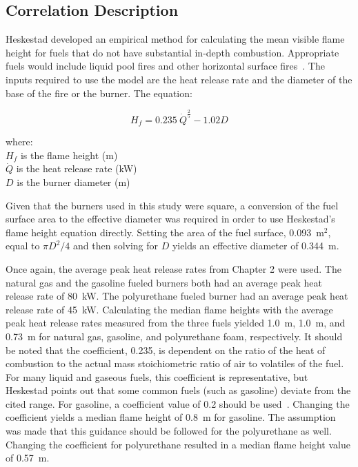 \documentclass[twoside]{uocthesis}
\begin{document}
{\subsection{Correlation Description}

Heskestad developed an empirical method for calculating the mean visible flame height for fuels that do not have substantial in-depth combustion.  Appropriate fuels would include liquid pool fires and other horizontal surface fires~\cite{Heskestad:SFPE,Beyler:1986}. The inputs required to use the model are the heat release rate and the diameter of the base of the fire or the burner.  The equation:

\begin{equation}\label{eq:flame_height}
H_f = 0.235\: \dot{Q}^{\frac{2}{5}} - 1.02 D
\end{equation}

\begin{tabbing}
where: \=  \\
{}
\> $H_{f}$ is the flame height (m)\\
\> $\dot{Q}$ is the heat release rate (kW) \\ 
\> $D$ is the burner diameter (m) \\
\end{tabbing}

Given that the burners used in this study were square, a conversion of the fuel surface area to the effective diameter was required in order to use Heskestad's flame height equation directly.  Setting the area of the fuel surface, 0.093~m$^2$, equal to $\pi D^2/4$ and then solving for $D$ yields an effective diameter of 0.344~m.

Once again, the average peak heat release rates from Chapter 2 were used.  The natural gas and the gasoline fueled burners both had an average peak heat release rate of 80~kW.  The polyurethane fueled burner had an average peak heat release rate of 45~kW.  Calculating the median flame heights with the average peak heat release rates measured from the three fuels yielded 1.0~m, 1.0~m, and 0.73~m for natural gas, gasoline, and polyurethane foam, respectively. It should be noted that the coefficient, 0.235, is dependent on the ratio of the heat of combustion to the actual mass stoichiometric ratio of air to volatiles of the fuel.  For many liquid and gaseous fuels, this coefficient is representative, but Heskestad points out that some common fuels (such as gasoline) deviate from the cited range. For gasoline, a coefficient value of 0.2 should be used~\cite{Heskestad:SFPE}. Changing the coefficient yields a median flame height of 0.8~m for gasoline.  The assumption was made that this guidance should be followed for the polyurethane as well. Changing the coefficient for polyurethane resulted in a median flame height value of 0.57~m. 

}
\end{document}
